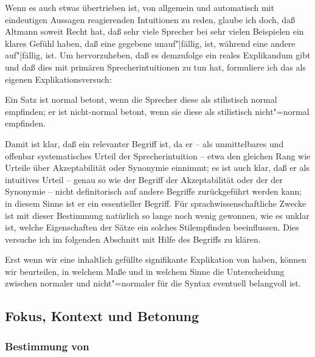 \documentclass[output=paper]{langsci/langscibook}
\begin{document}
Wenn es auch etwas übertrieben ist, von allgemein und automatisch mit eindeutigen Aussagen reagierenden Intuitionen zu reden, glaube ich doch, daß Altmann soweit Recht hat, daß sehr viele Sprecher bei sehr vielen Beispielen ein klares Gefühl haben, daß eine gegebene  unauf"|fällig,  ist, während eine andere  auf"|fällig,  ist. Um hervorzuheben, daß es demzufolge ein reales Explikandum gibt und daß dies mit primären Sprecherintuitionen zu tun hat, formuliere ich das als eigenen Explikationsversuch:
\begin{exe}
	\ex\label{ex:3-30}
Ein Satz ist normal betont, wenn die Sprecher diese  als
stilistisch normal empfinden; er ist nicht-normal betont, wenn sie
diese  als stilistisch nicht"=normal empfinden.
\end{exe}
Damit ist klar, daß  ein
relevanter Begriff ist, da er -- als unmittelbares und offenbar
systematisches Urteil der Sprecherintuition -- etwa den gleichen Rang
wie Urteile über Akzeptabilität oder Synonymie einnimmt; es ist auch
klar, daß er als intuitives Urteil -- genau so wie der Begriff der
Akzeptabilität oder der der Synonymie -- nicht definitorisch auf
andere Begriffe zurückgeführt werden kann; in diesem Sinne ist er ein
essentieller Begriff. Für sprachwissenschaftliche Zwecke ist mit
dieser Bestimmung natürlich so lange noch wenig gewonnen, wie es
unklar ist, welche Eigenschaften der Sätze ein solches Stilempfinden
beeinflussen. Dies versuche ich im folgenden Abschnitt mit Hilfe des
Begriffs  zu klären.

\largerpage
Erst wenn wir eine inhaltlich gefüllte signifikante Explikation von  haben, können wir beurteilen, in welchem Maße und in welchem Sinne die Unterscheidung
zwischen normaler und nicht"=normaler  \zb für die Syntax eventuell belangvoll ist.

\subsection{Fokus, Kontext und Betonung}
\label{subsec:3-1-3}

\subsubsection{Bestimmung von }
\label{subsubsec:3-1-3-1}
\end{document}
